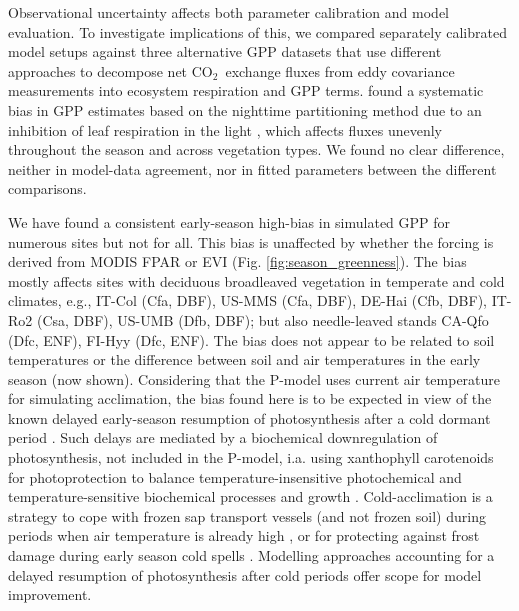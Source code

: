 \documentclass[gmd, manuscript]{copernicus}
\newcommand{\coo}{CO$_2$}
\begin{document}
Observational uncertainty affects both parameter calibration and model evaluation. To investigate implications of this, we compared separately calibrated model setups against three alternative GPP datasets that use different approaches to decompose net \coo\ exchange fluxes from eddy covariance measurements into ecosystem respiration and GPP terms. \citet{keenan19natee} found a systematic bias in GPP estimates based on the nighttime partitioning method due to an inhibition of leaf respiration in the light \citep{kok49, wehr16}, which affects fluxes unevenly throughout the season and across vegetation types. We found no clear difference, neither in model-data agreement, nor in fitted parameters between the different comparisons.

We have found a consistent early-season high-bias in simulated GPP for numerous sites but not for all. This bias is unaffected by whether the forcing is derived from MODIS FPAR or EVI (Fig. \ref{fig:season_greenness}). The bias mostly affects sites with deciduous broadleaved vegetation in temperate and cold climates, e.g., IT-Col (Cfa, DBF), US-MMS (Cfa, DBF), DE-Hai (Cfb, DBF), IT-Ro2 (Csa, DBF), US-UMB (Dfb, DBF); but also needle-leaved stands CA-Qfo (Dfc, ENF), FI-Hyy (Dfc, ENF). The bias does not appear to be related to soil temperatures or the difference between soil and air temperatures in the early season (now shown). Considering that the P-model uses current air temperature for simulating acclimation, the bias found here is to be expected in view of the known delayed early-season resumption of photosynthesis after a cold dormant period \citep{huner93, oquist03, adams04, verhoeven14, bowling18}. Such delays are mediated by a biochemical downregulation of photosynthesis, not included in the P-model, i.a. using xanthophyll carotenoids for photoprotection \citep{adams04} to balance temperature-insensitive photochemical and temperature-sensitive biochemical processes and growth \citep{oquist03}. Cold-acclimation is a strategy to cope with frozen sap transport vessels (and not frozen soil) during periods when air temperature is already high \citep{bowling18}, or for protecting against frost damage during early season cold spells \citep{vitasse14}. Modelling approaches accounting for a delayed resumption of photosynthesis after cold periods  \citet{pelkonen80, bergh98, makela04} offer scope for model improvement.
\end{document}
